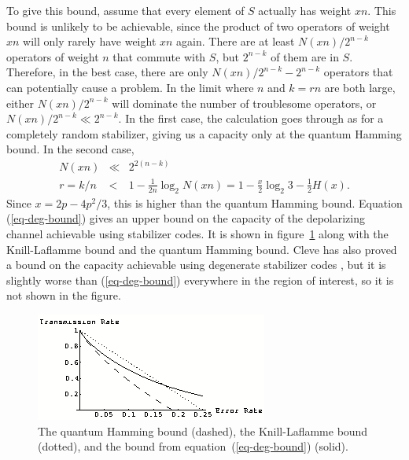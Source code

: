 To give this bound, assume that every element of $S$ actually has weight
$xn$.  This bound is unlikely to be achievable, since the product of two
operators of weight $xn$ will only rarely have weight $xn$ again.  There
are at least $N(xn)/2^{n-k}$ operators of weight $n$ that commute with $S$,
but $2^{n-k}$ of them are in $S$.  Therefore, in the best case, there are only
$N(xn)/2^{n-k} - 2^{n-k}$ operators that can potentially cause a problem.  In
the limit where $n$ and $k = rn$ are both large, either $N(xn)/2^{n-k}$ will
dominate the number of troublesome operators, or $N(xn)/2^{n-k} \ll 2^{n-
k}$.  In the first case, the calculation goes through as for a completely
random stabilizer, giving us a capacity only at the quantum Hamming
bound.  In the second case,
\begin{eqnarray}
	N(xn) & \ll & 2^{2(n-k)} \\
	r = k/n & < & 1 - \frac{1}{2n} \log_2 N(xn) = 1 - \frac{x}{2} \log_2 3 -
	\frac{1}{2} H(x).
	\label{eq-deg-bound}
\end{eqnarray}
Since $x = 2p - 4p^2/3$, this is higher than the quantum Hamming bound.
Equation (\ref{eq-deg-bound}) gives an upper bound on the capacity of the
depolarizing channel achievable using stabilizer codes.  It is shown in
figure~\ref{CCBounds} along with the Knill-Laflamme bound and the quantum
Hamming bound.  Cleve has also proved a bound on the capacity achievable
using degenerate stabilizer codes \cite{cleve-classical}, but it is slightly
worse than (\ref{eq-deg-bound}) everywhere in the region of interest, so
it is not shown in the figure.
\begin{figure}
	\includegraphics{Capacity.png}
	\caption[The quantum Hamming bound, the Knill-Laflamme bound, and the bound
	from equation~(\ref{eq-deg-bound})]{The quantum Hamming bound (dashed), the
	Knill-Laflamme bound (dotted), and the bound from equation~(\ref{eq-deg-bound})
		(solid).}
	\label{CCBounds}
\end{figure}